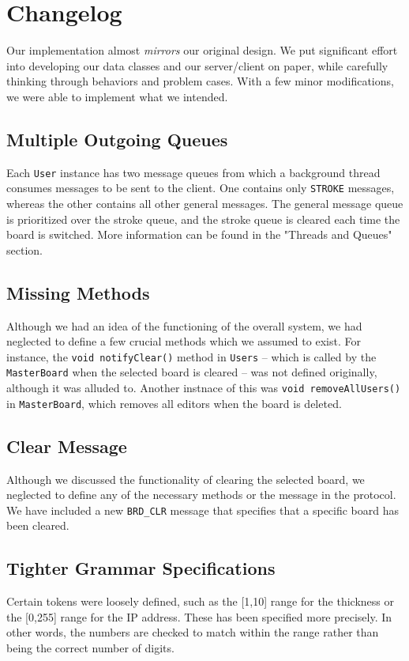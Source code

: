 \section{Changelog}
Our implementation almost \textit{mirrors} our original design. We put significant effort into developing our data classes and our server/client on paper, while carefully thinking through behaviors and problem cases. With a few minor modifications, we were able to implement what we intended.

\subsection{Multiple Outgoing Queues}
Each \texttt{User} instance has two message queues from which a background thread consumes messages to be sent to the client. One contains only \texttt{STROKE} messages, whereas the other contains all other general messages. The general message queue is prioritized over the stroke queue, and the stroke queue is cleared each time the board is switched. More information can be found in the "Threads and Queues" section.

\subsection{Missing Methods}
Although we had an idea of the functioning of the overall system, we had neglected to define a few crucial methods which we assumed to exist. For instance, the \texttt{void notifyClear()} method in \texttt{Users} -- which is called by the \texttt{MasterBoard} when the selected board is cleared -- was not defined originally, although it was alluded to. Another instnace of this was \texttt{void removeAllUsers()} in \texttt{MasterBoard}, which removes all editors when the board is deleted.

\subsection{Clear Message}
Although we discussed the functionality of clearing the selected board, we neglected to define any of the necessary methods or the message in the protocol. We have included a new \texttt{BRD\_CLR} message that specifies that a specific board has been cleared.

\subsection{Tighter Grammar Specifications}
Certain tokens were loosely defined, such as the [1,10] range for the thickness or the [0,255] range for the IP address. These has been specified more precisely. In other words, the numbers are checked to match within the range rather than being the correct number of digits.